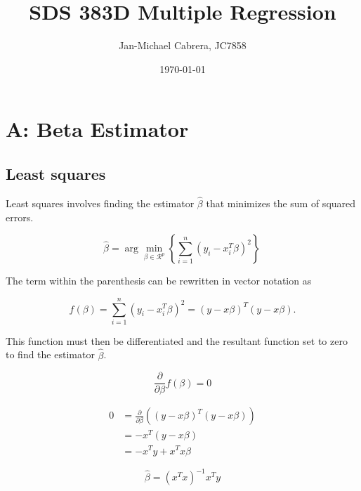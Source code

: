 \documentclass[12pt]{article}
\begin{document}
    \title{SDS 383D Multiple Regression}
    \author{Jan-Michael Cabrera, JC7858}
    \date{\today}
    \maketitle

    \section*{A: Beta Estimator}

        \subsection*{Least squares}

        Least squares involves finding the estimator $\hat{\beta}$ that minimizes the sum of squared errors.

        \begin{equation}
            \hat{\beta} = \arg \min_{\beta \in \mathcal{R}^p} \left\{  \sum_{i=1}^n (y_i - x_i^T \beta)^2 \right\}  \,
        \end{equation}

        \noindent The term within the parenthesis can be rewritten in vector notation as 

        \begin{equation}
            f(\beta) = \sum_{i=1}^n (y_i - x_i^T \beta)^2 = (y - x\beta)^T(y-x\beta).
        \end{equation}

        This function must then be differentiated and the resultant function set to zero to find the estimator $\hat{\beta}$.

        \begin{equation}
            \frac{\partial}{\partial \beta}f(\beta) = 0
        \end{equation}

        \begin{align}
            0 &= \frac{\partial}{\partial \beta} \left ( (y - x\beta)^T(y-x\beta) \right) \\
            & = -x^T (y-x\beta)\\
            & = -x^T y + x^T x \beta
        \end{align}

        \begin{equation}
            \hat{\beta} = (x^T x)^{-1} x^T y
        \end{equation}
\end{document}
